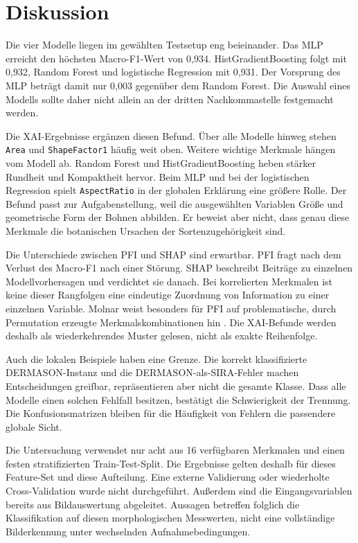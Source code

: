 \chapter{Diskussion}\label{chap:Diskussion}

Die vier Modelle liegen im gewählten Testsetup eng beieinander. Das MLP erreicht den höchsten Macro-F1-Wert von 0{,}934. HistGradientBoosting folgt mit 0{,}932, Random Forest und logistische Regression mit 0{,}931. Der Vorsprung des MLP beträgt damit nur 0{,}003 gegenüber dem Random Forest. Die Auswahl eines Modells sollte daher nicht allein an der dritten Nachkommastelle festgemacht werden.

Die XAI-Ergebnisse ergänzen diesen Befund. Über alle Modelle hinweg stehen \texttt{Area} und \texttt{ShapeFactor1} häufig weit oben. Weitere wichtige Merkmale hängen vom Modell ab. Random Forest und HistGradientBoosting heben stärker Rundheit und Kompaktheit hervor. Beim MLP und bei der logistischen Regression spielt \texttt{AspectRatio} in der globalen Erklärung eine größere Rolle. Der Befund passt zur Aufgabenstellung, weil die ausgewählten Variablen Größe und geometrische Form der Bohnen abbilden. Er beweist aber nicht, dass genau diese Merkmale die botanischen Ursachen der Sortenzugehörigkeit sind.

Die Unterschiede zwischen PFI und SHAP sind erwartbar. PFI fragt nach dem Verlust des Macro-F1 nach einer Störung. SHAP beschreibt Beiträge zu einzelnen Modellvorhersagen und verdichtet sie danach. Bei korrelierten Merkmalen ist keine dieser Rangfolgen eine eindeutige Zuordnung von Information zu einer einzelnen Variable. Molnar weist besonders für PFI auf problematische, durch Permutation erzeugte Merkmalskombinationen hin \cite[Kap.~23]{molnar2025interpretable}. Die XAI-Befunde werden deshalb als wiederkehrendes Muster gelesen, nicht als exakte Reihenfolge.

Auch die lokalen Beispiele haben eine Grenze. Die korrekt klassifizierte DERMASON-Instanz und die DERMASON-als-SIRA-Fehler machen Entscheidungen greifbar, repräsentieren aber nicht die gesamte Klasse. Dass alle Modelle einen solchen Fehlfall besitzen, bestätigt die Schwierigkeit der Trennung. Die Konfusionsmatrizen bleiben für die Häufigkeit von Fehlern die passendere globale Sicht.

Die Untersuchung verwendet nur acht aus 16 verfügbaren Merkmalen und einen festen stratifizierten Train-Test-Split. Die Ergebnisse gelten deshalb für dieses Feature-Set und diese Aufteilung. Eine externe Validierung oder wiederholte Cross-Validation wurde nicht durchgeführt. Außerdem sind die Eingangsvariablen bereits aus Bildauswertung abgeleitet. Aussagen betreffen folglich die Klassifikation auf diesen morphologischen Messwerten, nicht eine vollständige Bilderkennung unter wechselnden Aufnahmebedingungen.
